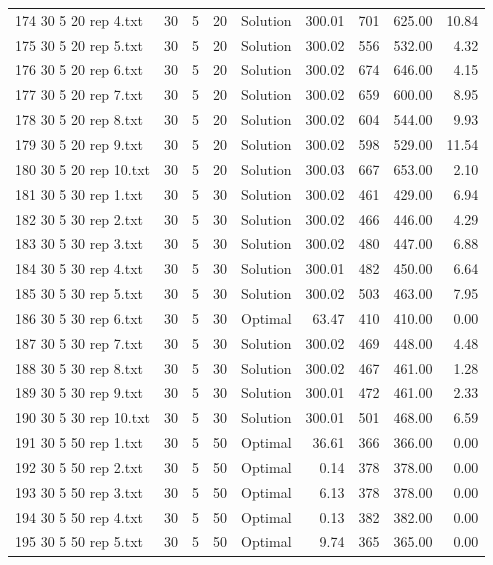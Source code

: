 \begin{longtable}{lrrllrrrr}
174 30 5 20 rep 4.txt & 30 & 5 & 20 & Solution & 300.01 & 701 & 625.00 & 10.84\\
175 30 5 20 rep 5.txt & 30 & 5 & 20 & Solution & 300.02 & 556 & 532.00 &  4.32\\
176 30 5 20 rep 6.txt & 30 & 5 & 20 & Solution & 300.02 & 674 & 646.00 &  4.15\\
177 30 5 20 rep 7.txt & 30 & 5 & 20 & Solution & 300.02 & 659 & 600.00 &  8.95\\
178 30 5 20 rep 8.txt & 30 & 5 & 20 & Solution & 300.02 & 604 & 544.00 &  9.93\\
179 30 5 20 rep 9.txt & 30 & 5 & 20 & Solution & 300.02 & 598 & 529.00 & 11.54\\
180 30 5 20 rep 10.txt & 30 & 5 & 20 & Solution & 300.03 & 667 & 653.00 &  2.10\\
181 30 5 30 rep 1.txt & 30 & 5 & 30 & Solution & 300.02 & 461 & 429.00 &  6.94\\
182 30 5 30 rep 2.txt & 30 & 5 & 30 & Solution & 300.02 & 466 & 446.00 &  4.29\\
183 30 5 30 rep 3.txt & 30 & 5 & 30 & Solution & 300.02 & 480 & 447.00 &  6.88\\
184 30 5 30 rep 4.txt & 30 & 5 & 30 & Solution & 300.01 & 482 & 450.00 &  6.64\\
185 30 5 30 rep 5.txt & 30 & 5 & 30 & Solution & 300.02 & 503 & 463.00 &  7.95\\
186 30 5 30 rep 6.txt & 30 & 5 & 30 & Optimal & 63.47 & 410 & 410.00 &  0.00\\
187 30 5 30 rep 7.txt & 30 & 5 & 30 & Solution & 300.02 & 469 & 448.00 &  4.48\\
188 30 5 30 rep 8.txt & 30 & 5 & 30 & Solution & 300.02 & 467 & 461.00 &  1.28\\
189 30 5 30 rep 9.txt & 30 & 5 & 30 & Solution & 300.01 & 472 & 461.00 &  2.33\\
190 30 5 30 rep 10.txt & 30 & 5 & 30 & Solution & 300.01 & 501 & 468.00 &  6.59\\
191 30 5 50 rep 1.txt & 30 & 5 & 50 & Optimal & 36.61 & 366 & 366.00 &  0.00\\
192 30 5 50 rep 2.txt & 30 & 5 & 50 & Optimal &  0.14 & 378 & 378.00 &  0.00\\
193 30 5 50 rep 3.txt & 30 & 5 & 50 & Optimal &  6.13 & 378 & 378.00 &  0.00\\
194 30 5 50 rep 4.txt & 30 & 5 & 50 & Optimal &  0.13 & 382 & 382.00 &  0.00\\
195 30 5 50 rep 5.txt & 30 & 5 & 50 & Optimal &  9.74 & 365 & 365.00 &  0.00\\

\end{longtable}
